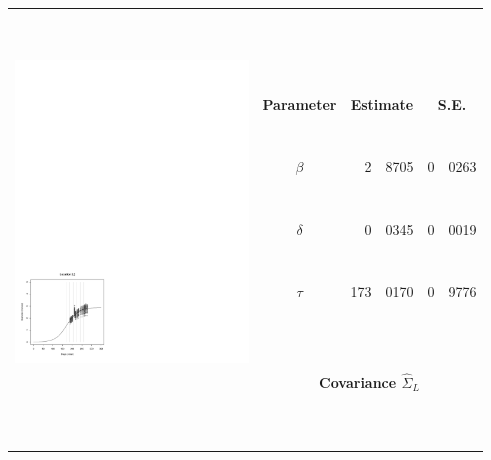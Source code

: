 


		\begin{tabular}{ccr@{.}lr@{.}l}
		\hline
		\hline
		 & &  \multicolumn{2}{c}{\ } & \multicolumn{2}{c}{\ } \\
		  & &  \multicolumn{2}{c}{\ } & \multicolumn{2}{c}{\ } \\
		 \multirow{10}{*}{ \includegraphics[height=80mm]{graphics/location_L.pdf}} &  \multicolumn{2}{c}{\ } & \multicolumn{2}{c}{\ } \\
		 & {\bf{Parameter}} & \multicolumn{2}{c}{{\bf{Estimate}}} & \multicolumn{2}{c}{{\bf{S.E.}}}  \\
		\cline{2-6}
		 & &  \multicolumn{2}{c}{\ } & \multicolumn{2}{c}{\ } \\
		& {\bf{$\beta$}} &	  2&8705		& 0&0263		\\
		 & &  \multicolumn{2}{c}{\ } & \multicolumn{2}{c}{\ } \\
		& {\bf{$\delta$}} &	  0&0345		& 0&0019		 \\
		 & &  \multicolumn{2}{c}{\ } & \multicolumn{2}{c}{\ } \\
		& {\bf{$\tau$}}	&	173&0170		& 0&9776		 \\
		 & &  \multicolumn{2}{c}{\ } & \multicolumn{2}{c}{\ } \\
		 & &  \multicolumn{2}{c}{\ } & \multicolumn{2}{c}{\ } \\
		 & \multicolumn{5}{c}{\bf{Covariance} $\hat{\Sigma}_L$ } \\
		\cline{2-6}
		& \multicolumn{5}{c}{ } \\
		 & &  \multicolumn{2}{c}{\ } & \multicolumn{2}{c}{\ } \\
		  & &  \multicolumn{2}{c}{\ } & \multicolumn{2}{c}{\ } \\
		 \hline
		\hline
		\end{tabular}


			